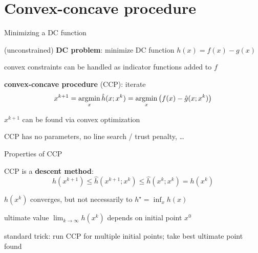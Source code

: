 \documentclass[aspectratio=169,11pt]{beamer}
\begin{document}
\section{Convex-concave procedure}
\begin{frame}{Minimizing a DC function}
\BIT
\item (unconstrained) \textbf{DC problem}: minimize DC function $h(x)=f(x)-g(x)$
\item convex constraints can be handled as indicator functions added to $f$
\item \textbf{convex-concave procedure} (CCP): iterate
\[
x^{k+1} = \mathop{\rm argmin}_x \hat h(x;x^k) =
\mathop{\rm argmin}_x \left( f(x) - \hat g(x;x^k)\right)
\]
\item $x^{k+1}$ can be found via convex optimization
\item CCP has no parameters, no line search / trust penalty, \ldots
\EIT
\end{frame}

\begin{frame}{Properties of CCP}
\BIT
\item CCP is a \textbf{descent method}:
\[
h(x^{k+1}) \leq \hat h(x^{k+1};x^k) \leq \hat h(x^k;x^k)=h(x^k)
\]
\item $h(x^k)$ converges, but not necessarily to $h^\star = \inf_x h(x)$
\item ultimate value $\lim_{k\to \infty} h(x^k)$ depends on initial point $x^0$
\item standard trick: run CCP for multiple initial points; take best ultimate point found
\EIT
\end{frame}

\end{document}
